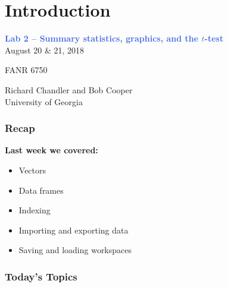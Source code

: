 \documentclass[color=usenames,dvipsnames]{beamer}\usepackage[]{graphicx}\usepackage[]{color}
\begin{document}



\section{Introduction}



\begin{frame}
  \LARGE
  \centering \par
  \textcolor{RoyalBlue}{\huge \bf Lab 2 -- Summary statistics,
    graphics, and the $t$-test} \\
  \vspace{1cm}
  August 20 \& 21, 2018 \par
  FANR 6750 \par
  \vfill
  \large
  Richard Chandler and Bob Cooper \\
  University of Georgia \\
\end{frame}




\begin{frame}[plain]
  \frametitle{Recap}
  \Large
  {\bf Last week we covered:}
  \begin{itemize}
    \item Vectors
    \item Data frames
    \item Indexing
    \item Importing and exporting data
    \item Saving and loading workspaces
  \end{itemize}
\end{frame}






\begin{frame}[plain]
  \frametitle{Today's Topics}
  \Large
\end{frame}
\end{document}
